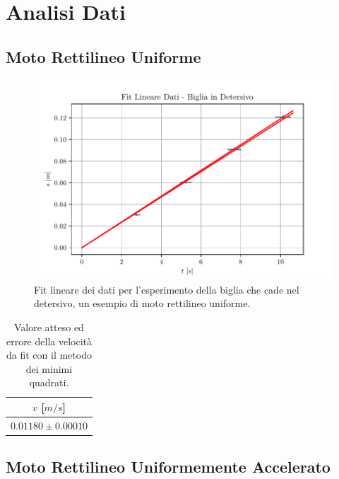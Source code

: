 \documentclass{report} \usepackage[T1]{fontenc} \usepackage[italian]{babel}
\begin{document}
\chapter{Analisi Dati}\label{appendix_data_analysis}
\section{Moto Rettilineo Uniforme}

\begin{figure}[H]
\centering
  \includegraphics[width=\textwidth]{fit_marble}
  \caption{Fit lineare dei dati per l'esperimento della biglia che cade nel detersivo,
           un esempio di moto rettilineo uniforme.}
  \label{fig:fit_marble}
\end{figure}

\begin{table}[H]
  \renewcommand{\arraystretch}{1.5}
  \centering
  \begin{tabular}{ | c | }
    \hline
    $v$ [$m/s$] \\
    \hline
    $0.01180\pm0.00010$ \\
    \hline
  \end{tabular}
  \caption{Valore atteso ed errore della velocità da fit con il metodo dei minimi
           quadrati.}
  \label{tab:fit_marble}
\end{table}

\section{Moto Rettilineo Uniformemente Accelerato}
\end{document}
